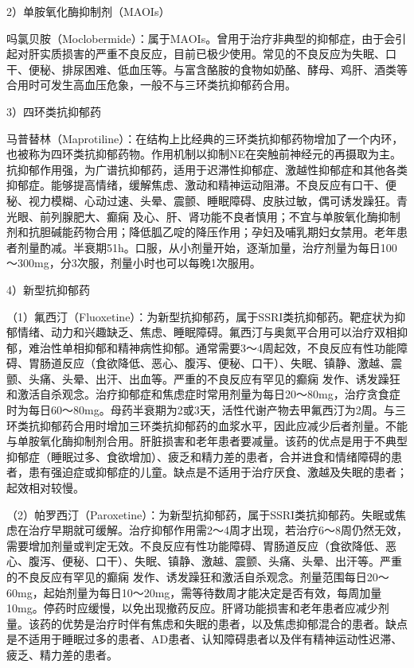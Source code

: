 2）单胺氧化酶抑制剂（MAOIs）

吗氯贝胺（Moclobermide）：属于MAOIs。曾用于治疗非典型的抑郁症，由于会引起对肝实质损害的严重不良反应，目前已极少使用。常见的不良反应为失眠、口干、便秘、排尿困难、低血压等。与富含酪胺的食物如奶酪、酵母、鸡肝、酒类等合用时可发生高血压危象，一般不与三环类抗抑郁药合用。

3）四环类抗抑郁药

马普替林（Maprotiline）：在结构上比经典的三环类抗抑郁药物增加了一个内环，也被称为四环类抗抑郁药物。作用机制以抑制NE在突触前神经元的再摄取为主。抗抑郁作用强，为广谱抗抑郁药，适用于迟滞性抑郁症、激越性抑郁症和其他各类抑郁症。能够提高情绪，缓解焦虑、激动和精神运动阻滞。不良反应有口干、便秘、视力模糊、心动过速、头晕、震颤、睡眠障碍、皮肤过敏，偶可诱发躁狂。青光眼、前列腺肥大、癫痫
及心、肝、肾功能不良者慎用；不宜与单胺氧化酶抑制剂和抗胆碱能药物合用；降低胍乙啶的降压作用；孕妇及哺乳期妇女禁用。老年患者剂量酌减。半衰期51h。口服，从小剂量开始，逐渐加量，治疗剂量为每日100～300mg，分3次服，剂量小时也可以每晚1次服用。

4）新型抗抑郁药

（1）氟西汀（Fluoxetine）：为新型抗抑郁药，属于SSRI类抗抑郁药。靶症状为抑郁情绪、动力和兴趣缺乏、焦虑、睡眠障碍。氟西汀与奥氮平合用可以治疗双相抑郁，难治性单相抑郁和精神病性抑郁。通常需要3～4周起效，不良反应有性功能障碍、胃肠道反应（食欲降低、恶心、腹泻、便秘、口干）、失眠、镇静、激越、震颤、头痛、头晕、出汗、出血等。严重的不良反应有罕见的癫痫
发作、诱发躁狂和激活自杀观念。治疗抑郁症和焦虑症时常用剂量为每日20～80mg，治疗贪食症时为每日60～80mg。母药半衰期为2或3天，活性代谢产物去甲氟西汀为2周。与三环类抗抑郁药合用时增加三环类抗抑郁药的血浆水平，因此应减少后者剂量。不能与单胺氧化酶抑制剂合用。肝脏损害和老年患者要减量。该药的优点是用于不典型抑郁症（睡眠过多、食欲增加）、疲乏和精力差的患者，合并进食和情绪障碍的患者，患有强迫症或抑郁症的儿童。缺点是不适用于治疗厌食、激越及失眠的患者；起效相对较慢。

（2）帕罗西汀（Paroxetine）：为新型抗抑郁药，属于SSRI类抗抑郁药。失眠或焦虑在治疗早期就可缓解。治疗抑郁作用需2～4周才出现，若治疗6～8周仍然无效，需要增加剂量或判定无效。不良反应有性功能障碍、胃肠道反应（食欲降低、恶心、腹泻、便秘、口干）、失眠、镇静、激越、震颤、头痛、头晕、出汗等。严重的不良反应有罕见的癫痫
发作、诱发躁狂和激活自杀观念。剂量范围每日20～60mg，起始剂量为每日10～20mg，需等待数周才能决定是否有效，每周加量10mg。停药时应缓慢，以免出现撤药反应。肝肾功能损害和老年患者应减少剂量。该药的优势是治疗时伴有焦虑和失眠的患者，以及焦虑抑郁混合的患者。缺点是不适用于睡眠过多的患者、AD患者、认知障碍患者以及伴有精神运动性迟滞、疲乏、精力差的患者。

